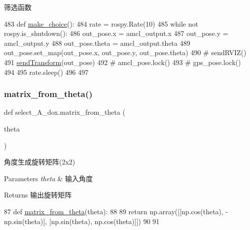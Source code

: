 筛选函数 


\begin{DoxyCode}
483 \textcolor{keyword}{def }\hyperlink{namespaceselect___a__dox_a0a0029d6640915baf31f3cb76c0658ab}{make\_choice}():
484     rate = rospy.Rate(10)
485     \textcolor{keywordflow}{while} \textcolor{keywordflow}{not} rospy.is\_shutdown():
486         out\_pose.x = amcl\_output.x
487         out\_pose.y = amcl\_output.y
488         out\_pose.theta = amcl\_output.theta
489         out\_pose.set\_map(out\_pose.x, out\_pose.y, out\_pose.theta)
490         \textcolor{comment}{# sendRVIZ()}
491         \hyperlink{namespaceselect___a__dox_a6b1af471c24514010bab83a744995d30}{sendTransform}(out\_pose)
492         \textcolor{comment}{# amcl\_pose.lock()}
493         \textcolor{comment}{# gps\_pose.lock()}
494 
495         rate.sleep()
496 
497 
\end{DoxyCode}
\mbox{\label{namespaceselect___a__dox_aeb9ae60d7e093e9212176c74ab48f697}} 
\subsubsection{\texorpdfstring{matrix\+\_\+from\+\_\+theta()}{matrix\_from\_theta()}}
{\footnotesize\ttfamily def select\+\_\+\+A\+\_\+dox.\+matrix\+\_\+from\+\_\+theta (\begin{DoxyParamCaption}\item[{}]{theta }\end{DoxyParamCaption})}



角度生成旋转矩阵(2x2) 


\begin{DoxyParams}{Parameters}
{\em theta} & 输入角度\\
\hline
\end{DoxyParams}
\begin{DoxyReturn}{Returns}
输出旋转矩阵 
\end{DoxyReturn}

\begin{DoxyCode}
87 \textcolor{keyword}{def }\hyperlink{namespaceselect___a__dox_aeb9ae60d7e093e9212176c74ab48f697}{matrix\_from\_theta}(theta):
88 
89     \textcolor{keywordflow}{return} np.array([[np.cos(theta), -np.sin(theta)], [np.sin(theta), np.cos(theta)]])
90 
91 
\end{DoxyCode}
\mbox{\label{namespaceselect___a__dox_a933f572519bc5396421db86a68a37916}} 
